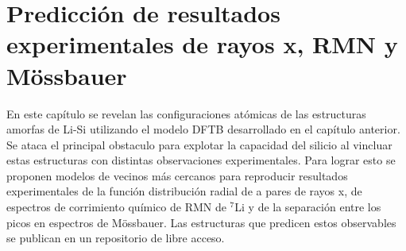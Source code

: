 \chapter{Predicción de resultados experimentales de rayos x, RMN y Mössbauer}\label{ch:prediccion}
\thispagestyle{empty}

\vspace{50pt}

\begin{adjustwidth}{50pt}{50pt}
    En este capítulo se revelan las configuraciones atómicas de las estructuras
    amorfas de Li-Si utilizando el modelo DFTB desarrollado en el capítulo 
    anterior. Se ataca el principal obstaculo para explotar la capacidad 
    del silicio al vincluar estas estructuras con distintas observaciones 
    experimentales. Para lograr esto se proponen modelos de vecinos más 
    cercanos para reproducir resultados experimentales de la función 
    distribución radial de a pares de rayos x, de espectros de corrimiento 
    químico de RMN de $^7$Li y de la separación entre los picos en espectros
    de Mössbauer. Las estructuras que predicen estos observables se publican
    en un repositorio de libre acceso.
\end{adjustwidth}

\clearpage
\newpage
\thispagestyle{empty}
\mbox{}
\newpage








